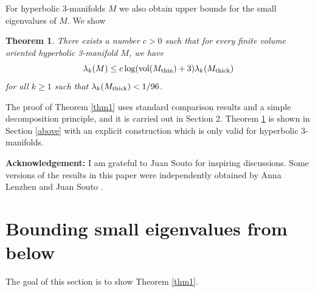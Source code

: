 \documentclass[11pt]{amsart}
\theoremstyle{plain}
\theoremstyle{plain}
\newtheorem{thm}{Theorem}
\theoremstyle{definition}
\renewcommand{\epsilon}{\varepsilon}
\begin{document}
For hyperbolic 3-manifolds $M$ we also obtain upper bounds  
for the small eigenvalues of $M$. We show

\begin{thm}\label{thm2}
There exists a number $c>0$ such that for every finite volume 
oriented hyperbolic 3-manifold $M$, we have  
\[\lambda_k(M)\leq c\log ({\rm vol}(M_{\rm thin})+3)\lambda_k(M_{\rm thick})\]
for all $k\geq 1$ such  that $\lambda_k(M_{\rm thick})<1/96$.
\end{thm}



The proof of Theorem \ref{thm1} uses standard comparison results and a
simple decomposition principle, and it is 
carried out in Section 2. Theorem \ref{thm2}
is shown in Section \ref{above}
with an explicit construction which is only 
valid for hyperbolic 3-manifolds. 


\bigskip\noindent 
{\bf Acknowledgement:} I am grateful to Juan Souto for
inspiring discussions. Some versions of the results in this paper
were independently obtained by 
Anna Lenzhen and Juan Souto  \cite{LS16}.

 






\section{Bounding small eigenvalues from below}\label{below}

The goal of this section is to show Theorem \ref{thm1}.
\end{document}
